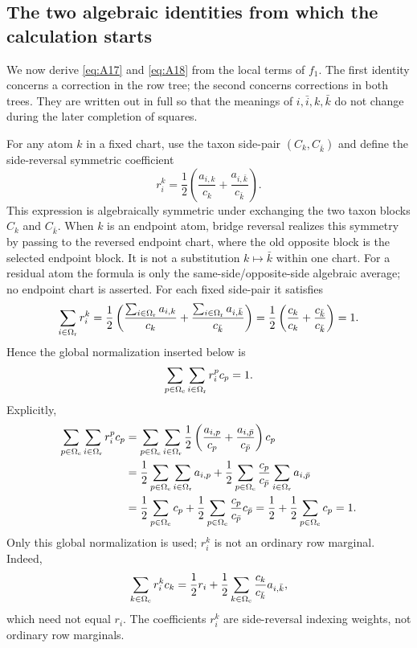 \documentclass[11pt]{article}
\begin{document}
\subsection{The two algebraic identities from which the calculation starts}

We now derive \eqref{eq:A17} and \eqref{eq:A18} from the local terms of
$f_1$.  The first identity concerns a correction in the row tree; the second
concerns corrections in both trees.  They are written out in full so that
the meanings of $i,\bar i,k,\bar k$ do not change during the later
completion of squares.

For any atom $k$ in a fixed chart, use the taxon side-pair
$(C_k,C_{\bar k})$ and define the side-reversal symmetric coefficient
\[
r_i^k=\frac12\left(\frac{a_{i,k}}{c_k}+\frac{a_{i,\bar k}}{c_{\bar k}}\right).
\]
This expression is algebraically symmetric under exchanging the two taxon
blocks $C_k$ and $C_{\bar k}$.  When $k$ is an endpoint atom, bridge reversal
realizes this symmetry by passing to the reversed endpoint chart,
where the old opposite block is the selected endpoint block.  It is not a
substitution $k\mapsto\bar k$ within one chart.  For a residual atom the
formula is only the same-side/opposite-side algebraic average; no endpoint
chart is asserted.
For each fixed side-pair it satisfies
\[
\sum_{i\in\Omega_{\rm r}} r_i^k
=\frac12\left(
\frac{\sum_{i\in\Omega_{\rm r}} a_{i,k}}{c_k}
+\frac{\sum_{i\in\Omega_{\rm r}} a_{i,\bar k}}{c_{\bar k}}
\right)
=\frac12\left(\frac{c_k}{c_k}+\frac{c_{\bar k}}{c_{\bar k}}\right)=1.
\]
Hence the global normalization inserted below is
\[
\sum_{p\in\Omega_{\rm c}}\sum_{i\in\Omega_{\rm r}} r_i^p c_p=1.
\]
Explicitly,
\[
\begin{aligned}
\sum_{p\in\Omega_{\rm c}}\sum_{i\in\Omega_{\rm r}} r_i^p c_p
&=\sum_{p\in\Omega_{\rm c}}\sum_{i\in\Omega_{\rm r}}
\frac12\left(\frac{a_{i,p}}{c_p}+\frac{a_{i,\bar p}}{c_{\bar p}}\right)c_p\\
&=\frac12\sum_{p\in\Omega_{\rm c}}\sum_{i\in\Omega_{\rm r}} a_{i,p}
+\frac12\sum_{p\in\Omega_{\rm c}}\frac{c_p}{c_{\bar p}}
 \sum_{i\in\Omega_{\rm r}}a_{i,\bar p}\\
&=\frac12\sum_{p\in\Omega_{\rm c}}c_p
+\frac12\sum_{p\in\Omega_{\rm c}}\frac{c_p}{c_{\bar p}}c_{\bar p}
=\frac12+\frac12\sum_{p\in\Omega_{\rm c}}c_p=1.
\end{aligned}
\]
Only this global normalization is used; $r_i^k$ is not an ordinary row
marginal.  Indeed,
\[
\sum_{k\in\Omega_{\rm c}} r_i^k c_k
=\frac12 r_i+\frac12\sum_{k\in\Omega_{\rm c}}
\frac{c_k}{c_{\bar k}}a_{i,\bar k},
\]
which need not equal $r_i$.  The coefficients $r_i^k$ are side-reversal
indexing weights, not ordinary row marginals.
\end{document}
